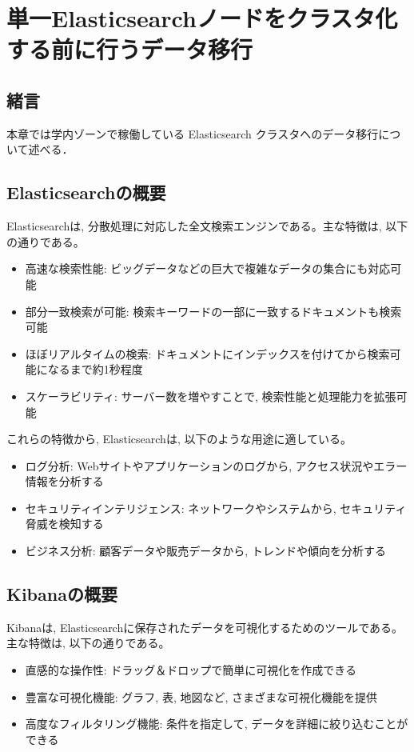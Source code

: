 
\chapter{単一Elasticsearchノードをクラスタ化する前に行うデータ移行}
\label{chap:third}

\section{緒言}
本章では学内ゾーンで稼働している Elasticsearch クラスタへのデータ移行について述べる．

\section{Elasticsearchの概要}
Elasticsearchは, 分散処理に対応した全文検索エンジンである。主な特徴は, 以下の通りである。

\begin{itemize}
  \item 高速な検索性能: ビッグデータなどの巨大で複雑なデータの集合にも対応可能
  \item 部分一致検索が可能: 検索キーワードの一部に一致するドキュメントも検索可能
  \item ほぼリアルタイムの検索: ドキュメントにインデックスを付けてから検索可能になるまで約1秒程度
  \item スケーラビリティ: サーバー数を増やすことで, 検索性能と処理能力を拡張可能
\end{itemize}

これらの特徴から, Elasticsearchは, 以下のような用途に適している。

\begin{itemize}
  \item ログ分析: Webサイトやアプリケーションのログから, アクセス状況やエラー情報を分析する
  \item セキュリティインテリジェンス: ネットワークやシステムから, セキュリティ脅威を検知する
  \item ビジネス分析: 顧客データや販売データから, トレンドや傾向を分析する
\end{itemize}

\section{Kibanaの概要}

Kibanaは, Elasticsearchに保存されたデータを可視化するためのツールである。主な特徴は, 以下の通りである。

\begin{itemize}
  \item 直感的な操作性: ドラッグ＆ドロップで簡単に可視化を作成できる
  \item 豊富な可視化機能: グラフ, 表, 地図など, さまざまな可視化機能を提供
  \item 高度なフィルタリング機能: 条件を指定して, データを詳細に絞り込むことができる
\end{itemize}

